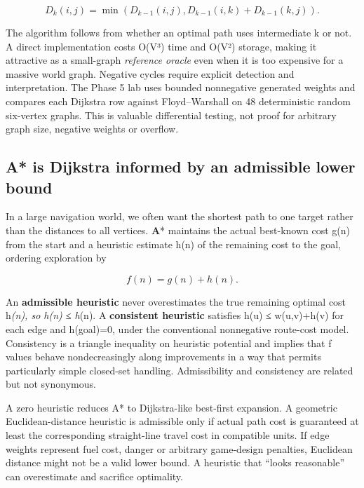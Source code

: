 \[
D_k(i,j)=\min\!\left(D_{k-1}(i,j),
D_{k-1}(i,k)+D_{k-1}(k,j)\right).
\]

The algorithm follows from whether an optimal path uses intermediate k or not. A direct implementation costs O(V³) time and O(V²) storage, making it attractive as a small-graph \emph{reference oracle} even when it is too expensive for a massive world graph. Negative cycles require explicit detection and interpretation. The Phase 5 lab uses bounded nonnegative generated weights and compares each Dijkstra row against Floyd--Warshall on 48 deterministic random six-vertex graphs. This is valuable differential testing, not proof for arbitrary graph size, negative weights or overflow.

\subsection{A* is Dijkstra informed by an admissible lower bound}\label{01-foundations-i-ch008-a-is-dijkstra-informed-by-an-admissible-lower-bound}

\hypertarget{01-foundations-i-ch008-a-is-dijkstra-informed-by-an-admissible-lower-bound}{}

In a large navigation world, we often want the shortest path to one target rather than the distances to all vertices. \textbf{A}* maintains the actual best-known cost g(n) from the start and a heuristic estimate h(n) of the remaining cost to the goal, ordering exploration by

\[
f(n)=g(n)+h(n).
\]

An \textbf{admissible heuristic} never overestimates the true remaining optimal cost h\emph{(n), so h(n) ≤ h}(n). A \textbf{consistent heuristic} satisfies h(u) ≤ w(u,v)+h(v) for each edge and h(goal)=0, under the conventional nonnegative route-cost model. Consistency is a triangle inequality on heuristic potential and implies that f values behave nondecreasingly along improvements in a way that permits particularly simple closed-set handling. Admissibility and consistency are related but not synonymous.

A zero heuristic reduces A* to Dijkstra-like best-first expansion. A geometric Euclidean-distance heuristic is admissible only if actual path cost is guaranteed at least the corresponding straight-line travel cost in compatible units. If edge weights represent fuel cost, danger or arbitrary game-design penalties, Euclidean distance might not be a valid lower bound. A heuristic that ``looks reasonable'' can overestimate and sacrifice optimality.

